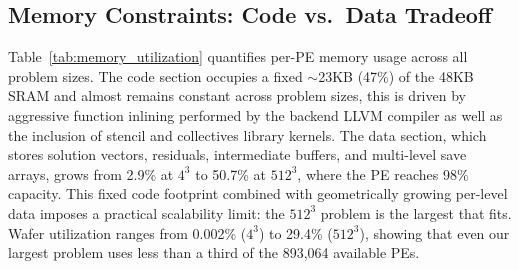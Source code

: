 \documentclass[conference]{IEEEtran}
\begin{document}


        \subsection{Memory Constraints: Code vs.\ Data Tradeoff}
            Table~\ref{tab:memory_utilization} quantifies per-PE memory usage across all problem sizes. The code section occupies a fixed ${\sim}$23KB (47\%) of the 48KB SRAM and almost remains constant across problem sizes, this is driven by aggressive function inlining performed by the backend LLVM compiler as well as the inclusion of stencil and collectives library kernels. The data section, which stores solution vectors, residuals, intermediate buffers, and multi-level save arrays, grows from 2.9\% at $4^3$ to 50.7\% at $512^3$, where the PE reaches 98\% capacity. This fixed code footprint combined with geometrically growing per-level data imposes a practical scalability limit: the $512^3$ problem is the largest that fits. Wafer utilization ranges from 0.002\% ($4^3$) to 29.4\% ($512^3$), showing that even our largest problem uses less than a third of the 893,064 available PEs.
            
\end{document}
